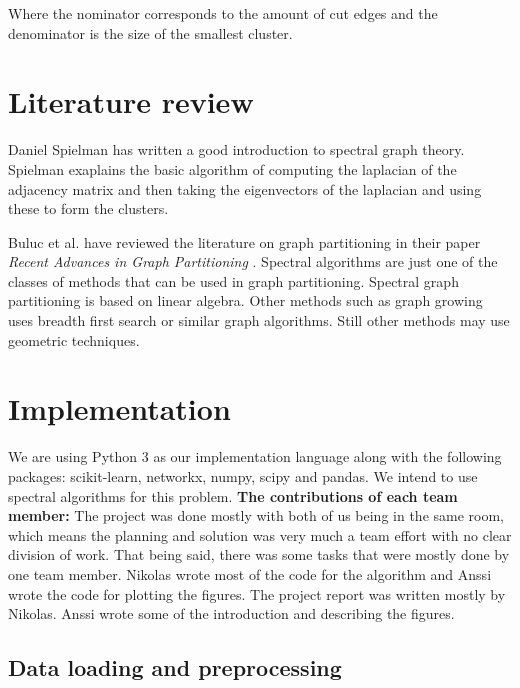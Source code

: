 \documentclass{article}
\begin{document}
Where the nominator corresponds to the amount of cut edges and the denominator is the size of the smallest cluster. 

\section{Literature review}
Daniel Spielman \cite{spielman} has written a good introduction to spectral graph theory.
Spielman exaplains the basic algorithm of computing the laplacian of the adjacency
matrix and then taking the eigenvectors of the laplacian and using these to form the clusters.

Buluc et al. have reviewed the literature on graph partitioning
in their paper \textit{Recent Advances in Graph Partitioning} \cite{buluc}.
Spectral algorithms are just one of the classes of methods that can be used
in graph partitioning. Spectral graph partitioning is based on linear algebra.
Other methods such as graph growing uses breadth first search or similar graph algorithms.
Still other methods may use geometric techniques\cite{buluc}.



\section{Implementation} %

We are using Python 3 as our implementation language along with the following packages: scikit-learn, networkx, numpy, scipy and pandas. We intend to use spectral algorithms for this problem.
\newline\newline
\textbf{The contributions of each team member:}\newline
The project was done mostly with both of us being in the same room, which means the
planning and solution was very much a team effort with no clear division of work. That being said,
there was some tasks that were mostly done by one team member. Nikolas wrote most of the code
for the algorithm and Anssi wrote the code for plotting the figures. The project
report was written mostly by Nikolas. Anssi wrote some of the introduction and
describing the figures.

\subsection{Data loading and preprocessing}
\end{document}
